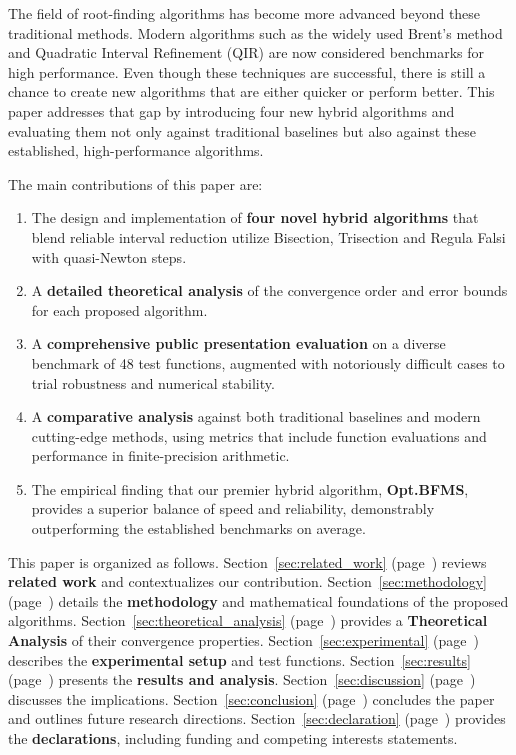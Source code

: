 \documentclass[amsmath, amssymb, aps]{revtex4-2}
\begin{document}
The field of root-finding algorithms has become more advanced beyond these traditional methods. Modern algorithms such as the widely used Brent's method \cite{brent1973algorithms} and Quadratic Interval Refinement (QIR) \cite{abbott2014quadratic} are now considered benchmarks for high performance. Even though these techniques are successful, there is still a chance to create new algorithms that are either quicker or perform better. This paper addresses that gap by introducing four new hybrid algorithms and evaluating them not only against traditional baselines but also against these established, high-performance algorithms.

The main contributions of this paper are:
\begin{enumerate}
    \item The design and implementation of \textbf{four novel hybrid algorithms} that blend reliable interval reduction utilize Bisection, Trisection and Regula Falsi with quasi-Newton steps.
    \item A \textbf{detailed theoretical analysis} of the convergence order and error bounds for each proposed algorithm.
    \item A \textbf{comprehensive public presentation evaluation} on a diverse benchmark of 48 test functions, augmented with notoriously difficult cases to trial robustness and numerical stability.
    \item A \textbf{comparative analysis} against both traditional baselines and modern cutting-edge methods, using metrics that include function evaluations and performance in finite-precision arithmetic.
    \item The empirical finding that our premier hybrid algorithm, \textbf{Opt.BFMS}, provides a superior balance of speed and reliability, demonstrably outperforming the established benchmarks on average.
\end{enumerate}

This paper is organized as follows. Section~\ref{sec:related_work} (page~\pageref{sec:related_work}) reviews \textbf{related work} and contextualizes our contribution. Section~\ref{sec:methodology} (page~\pageref{sec:methodology}) details the \textbf{methodology} and mathematical foundations of the proposed algorithms. Section~\ref{sec:theoretical_analysis} (page~\pageref{sec:theoretical_analysis}) provides a \textbf{Theoretical Analysis} of their convergence properties. Section~\ref{sec:experimental} (page~\pageref{sec:experimental}) describes the \textbf{experimental setup} and test functions. Section~\ref{sec:results} (page~\pageref{sec:results}) presents the \textbf{results and analysis}. Section~\ref{sec:discussion} (page~\pageref{sec:discussion}) discusses the implications. Section~\ref{sec:conclusion} (page~\pageref{sec:conclusion}) concludes the paper and outlines future research directions. Section~\ref{sec:declaration} (page~\pageref{sec:declaration}) provides the \textbf{declarations}, including funding and competing interests statements.
\end{document}
